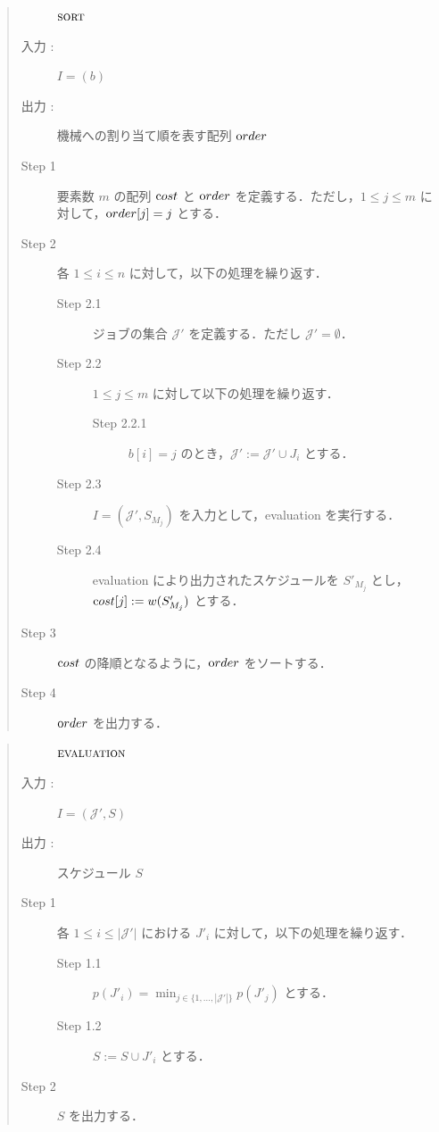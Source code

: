 \documentclass[12pt]{optlab-bachelor}
\begin{document}
\begin{quote}
  \begin{description}
    \item[] ${\mbox {\bf {\sc sort}}}$
    \item[入力 :] $I = (b)$
    \item[出力 :] 機械への割り当て順を表す配列 ${\mbox order}$
  \end{description}
  \begin{description}
    \item[Step 1] 要素数 $m$ の配列 ${\mbox cost}$ と ${\mbox order}$ を定義する．ただし，$1 \le j \le m $ に対して，${\mbox order}[j] = j$ とする．
    \item[Step 2] 各 $1 \le i \le n$ に対して，以下の処理を繰り返す．
    \begin{description}
      \item[Step 2.1] ジョブの集合 $\mathcal{J}'$ を定義する．ただし $\mathcal{J}' = \emptyset$．
      \item[Step 2.2] $1 \le j \le m$ に対して以下の処理を繰り返す．
      \begin{description}
        \item[Step 2.2.1] $b[i] = j$ のとき，$\mathcal{J}' :=\mathcal{J}' \cup J_i$ とする．
      \end{description}
      \item[Step 2.3] $I = (\mathcal{J}',S_{M_j})$ を入力として，{\sc evaluation} を実行する．
      \item[Step 2.4] {\sc evaluation} により出力されたスケジュールを $S'_{M_j}$ とし，\\${\mbox cost}[j] := w(S'_{M_j})$ とする．
    \end{description}
    \item[Step 3] ${\mbox cost}$ の降順となるように，${\mbox order}$ をソートする．
    \item[Step 4] ${\mbox order}$ を出力する．
  \end{description}
\end{quote}


\begin{quote}
  \begin{description}
    \item[] ${\mbox {\bf {\sc evaluation}}}$
    \item[入力 :] $I = (\mathcal{J'},S)$
    \item[出力 :] スケジュール $S$
  \end{description}
  \begin{description}
    \item[Step 1] 各 $1 \le i \le |\mathcal{J}'|$ における $J'_i$ に対して，以下の処理を繰り返す．
    \begin{description}
      \item[Step 1.1] $p(J'_i) = \displaystyle \min_{j \in \{1,\ldots,|\mathcal{J}'|\}}p(J'_j)$ とする．
      \item[Step 1.2] $S := S \cup J'_i$ とする．
    \end{description}
    \item[Step 2] $S$ を出力する．
  \end{description}
\end{quote}
\end{document}
